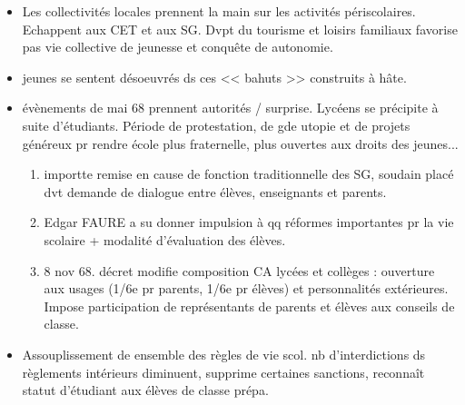 \documentclass[12pt]{report}
\begin{document}
\begin{itemize}
\item Les collectivités locales prennent la main sur les activités périscolaires. Echappent aux CET et aux SG. Dvpt du tourisme et loisirs familiaux favorise pas vie collective de jeunesse et conquête de autonomie. \\

\item jeunes se sentent désoeuvrés ds ces << bahuts >> construits à hâte. \\

\item évènements de mai 68 prennent autorités / surprise. Lycéens se précipite à suite d'étudiants. Période de protestation, de gde utopie et de projets généreux pr rendre école plus fraternelle, plus ouvertes aux droits des jeunes... \\
\begin{enumerate}
\item importte remise en cause de fonction traditionnelle des SG, soudain placé dvt demande de dialogue entre élèves, enseignants et parents. \\
\item Edgar FAURE a su donner impulsion à qq réformes importantes pr la vie scolaire + modalité d'évaluation des élèves.


\vspace{0.5cm}

\item 8 nov 68. décret modifie composition CA lycées et collèges : ouverture aux usages (1/6e pr parents, 1/6e pr élèves) et personnalités extérieures. Impose participation de représentants de parents et élèves aux conseils de classe. \\
\end{enumerate}


\item Assouplissement de ensemble des règles de vie scol. nb d'interdictions ds règlements intérieurs diminuent, supprime certaines sanctions, reconnaît statut d'étudiant aux élèves de classe prépa. \\


\end{itemize}
\end{document}
